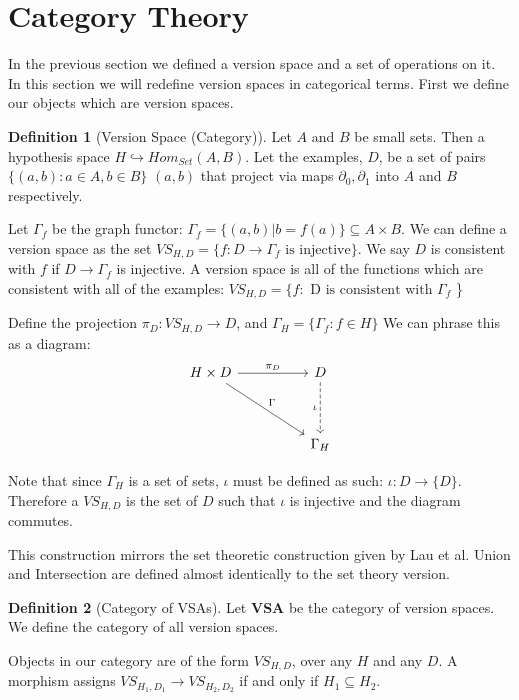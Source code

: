\documentclass{article}
\theoremstyle{definition}
\newtheorem{definition}{Definition}[section]
\begin{document}
\section{Category Theory}
In the previous section we defined a version space and a set of operations on it. In this section we will redefine version spaces in categorical terms. First we define our objects which are version spaces. 

\begin{definition}[Version Space (Category)]
Let $A$ and $B$ be small sets. Then a hypothesis space $H \hookrightarrow Hom_{Set}(A, B)$. Let the examples, $D$, be a set of pairs $\{(a,b) : a \in A, b \in B\}$ $(a,b)$ that project via maps $\partial_0, \partial_1$ into $A$ and $B$ respectively.

Let $\Gamma_f$ be the graph functor: $\Gamma_f = \{(a,b) | b = f(a)\} \subseteq A\times B$. We can define a version space as the set  $VS_{H,D} = \{f : D \rightarrow \Gamma_f \text{ is injective}\}$. We say $D$ is consistent with $f$ if $D \rightarrow \Gamma_f$ is injective. A version space is all of the functions which are consistent with all of the examples: $VS_{H, D} = \{f : \text{ D is consistent with } \Gamma_f $ \}

Define the projection $\pi_D : VS_{H,D} \rightarrow D$, and $\Gamma_H = \{\Gamma_f : f \in H\}$
We can phrase this as a diagram: 
\[\begin{tikzcd}
	{H\times D} && D \\
	\\
	&& {\Gamma_H}
	\arrow["\Gamma", from=1-1, to=3-3]
	\arrow["{\pi_{D}}", from=1-1, to=1-3]
	\arrow["\iota"', dashed, from=1-3, to=3-3]
\end{tikzcd}\]

Note that since $\Gamma_H$ is a set of sets, $\iota$ must be defined as such: $\iota: D\rightarrow \{D\}$. Therefore a $VS_{H,D}$ is the set of $D$ such that $\iota$ is injective and the diagram commutes.

\end{definition}

This construction mirrors the set theoretic construction given by Lau et al. \cite{short} Union and Intersection are defined almost identically to the set theory version. 


\begin{definition}[Category of VSAs]
Let \textbf{VSA} be the category of version spaces. We define the category of all version spaces. 

Objects in our category are of the form $VS_{H,D}$, over any $H$ and any $D$. A morphism assigns $VS_{H_1, D_1} \rightarrow VS_{H_2, D_2}$ if and only if $H_1 \subseteq H_2$.
\end{definition}
\end{document}
